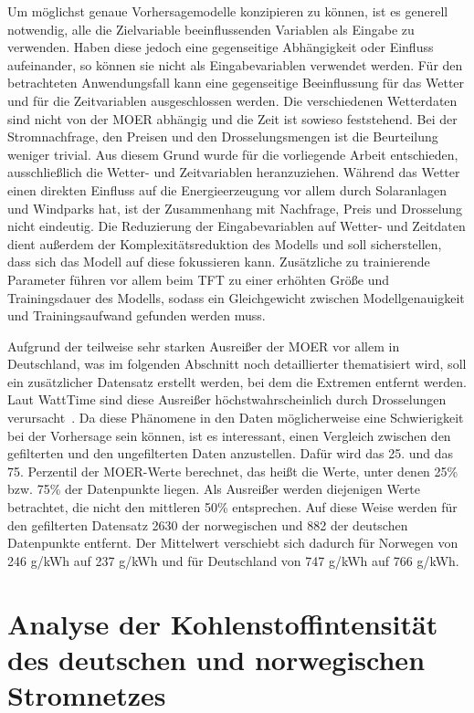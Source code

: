 Um möglichst genaue Vorhersagemodelle konzipieren zu können, ist es generell notwendig, alle die Zielvariable beeinflussenden Variablen als Eingabe zu verwenden.
Haben diese jedoch eine gegenseitige Abhängigkeit oder Einfluss aufeinander, so können sie nicht als Eingabevariablen verwendet werden.
Für den betrachteten Anwendungsfall kann eine gegenseitige Beeinflussung für das Wetter und für die Zeitvariablen ausgeschlossen werden.
Die verschiedenen Wetterdaten sind nicht von der \ac{MOER} abhängig und die Zeit ist sowieso feststehend.
Bei der Stromnachfrage, den Preisen und den Drosselungsmengen ist die Beurteilung weniger trivial.
Aus diesem Grund wurde für die vorliegende Arbeit entschieden, ausschließlich die Wetter- und Zeitvariablen heranzuziehen.
Während das Wetter einen direkten Einfluss auf die Energieerzeugung vor allem durch Solaranlagen und Windparks hat, ist der Zusammenhang mit Nachfrage, Preis und Drosselung nicht eindeutig.
Die Reduzierung der Eingabevariablen auf Wetter- und Zeitdaten dient außerdem der Komplexitätsreduktion des Modells und soll sicherstellen, dass sich das Modell auf diese fokussieren kann.
Zusätzliche zu trainierende Parameter führen vor allem beim \ac{TFT} zu einer erhöhten Größe und Trainingsdauer des Modells, sodass ein Gleichgewicht zwischen Modellgenauigkeit und Trainingsaufwand gefunden werden muss.

Aufgrund der teilweise sehr starken Ausreißer der \ac{MOER} vor allem in Deutschland, was im folgenden Abschnitt noch detaillierter thematisiert wird, soll ein zusätzlicher Datensatz erstellt werden, bei dem die Extremen entfernt werden.
Laut WattTime sind diese Ausreißer höchstwahrscheinlich durch Drosselungen verursacht~\cite{WattTime.2022}.
Da diese Phänomene in den Daten möglicherweise eine Schwierigkeit bei der Vorhersage sein können, ist es interessant, einen Vergleich zwischen den gefilterten und den ungefilterten Daten anzustellen.
Dafür wird das 25. und das 75. Perzentil der \ac{MOER}-Werte berechnet, das heißt die Werte, unter denen 25\% bzw. 75\% der Datenpunkte liegen.
Als Ausreißer werden diejenigen Werte betrachtet, die nicht den mittleren 50\% entsprechen.
Auf diese Weise werden für den gefilterten Datensatz 2630 der norwegischen und 882 der deutschen Datenpunkte entfernt.
Der Mittelwert verschiebt sich dadurch für Norwegen von 246 g/\ac{kWh} auf 237 g/\ac{kWh} und für Deutschland von 747 g/\ac{kWh} auf 766 g/\ac{kWh}.

\section{Analyse der Kohlenstoffintensität des deutschen und norwegischen Stromnetzes}\label{CAP:ci-analysis}

